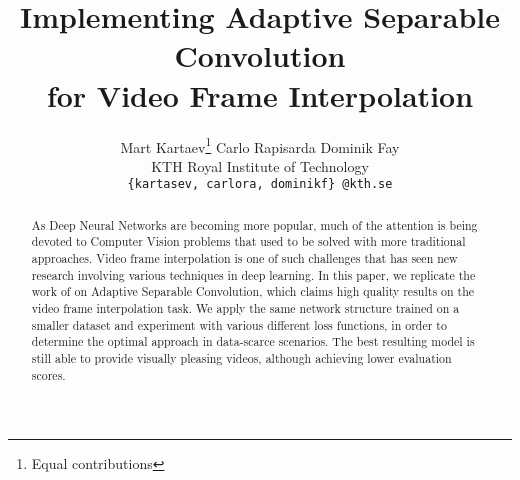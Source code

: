 \documentclass[10pt,twocolumn,letterpaper]{article}
\begin{document}

\title{Implementing Adaptive Separable Convolution\\
for Video Frame Interpolation}


\author{%
Mart Kartaev\thanks{Equal contributions}\qquad%
Carlo Rapisarda\footnotemark[1]\qquad%
Dominik Fay\footnotemark[1]\\
KTH Royal Institute of Technology\\
{\tt\small \{kartasev, carlora, dominikf\} @kth.se}}

\maketitle


\begin{abstract}
\label{sec:abstract}

As Deep Neural Networks are becoming more popular, much of the attention is being devoted to Computer Vision problems that used to be solved with more traditional approaches. Video frame interpolation is one of such challenges that has seen new research involving various techniques in deep learning. In this paper, we replicate the work of \textnormal{\citeauthor{SepConv}} on Adaptive Separable Convolution, which claims high quality results on the video frame interpolation task. We apply the same network structure trained on a smaller dataset and experiment with various different loss functions, in order to determine the optimal approach in data-scarce scenarios. The best resulting model is still able to provide visually pleasing videos, although achieving lower evaluation scores.
\end{abstract}
\end{document}
